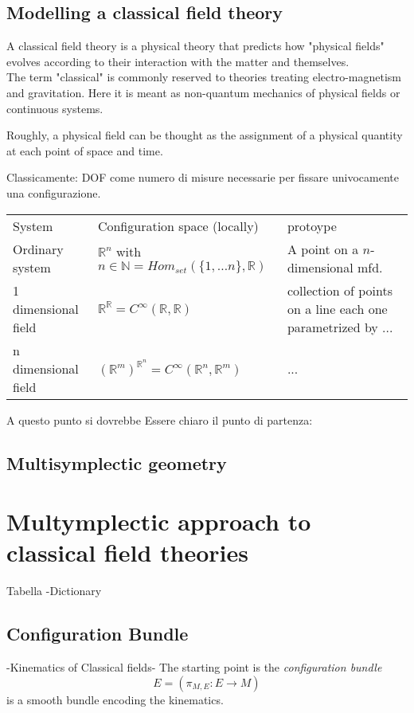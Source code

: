 \subsection{Modelling a classical field theory}
A classical field theory is a physical theory that predicts how "physical fields" evolves according to their interaction with the matter and themselves.
\\
The term "classical" is commonly reserved to theories treating electro-magnetism and gravitation. Here it is meant as non-quantum mechanics of physical fields or continuous systems.

Roughly, a physical field can be thought as the assignment of a physical quantity at each point of space and time.


Classicamente: DOF come numero di misure necessarie per fissare univocamente una configurazione.
\begin{table}[]
\begin{tabular}{lll}
	System & Configuration space (locally) & protoype 
 	\\
	Ordinary system & $\mathbb{R}^n$ with $n\in \mathbb{N} = Hom_{set}(\{1,\ldots n\}, \mathbb{R})$ & A point on a $n$-dimensional mfd.
	\\
	1 dimensional field & $\mathbb{R}^\mathbb{R} = C^\infty(\mathbb{R},\mathbb{R})$ & collection of points on a line each one parametrized by ...
	\\
	n dimensional field & $(\mathbb{R}^m)^{\mathbb{R}^n} = C^\infty (\mathbb{R}^n, \mathbb{R}^m)$ & ...
\end{tabular}
\end{table}

A questo punto si dovrebbe Essere chiaro il punto di partenza:
\\

\subsection{Multisymplectic geometry}


\section{Multymplectic approach to classical field theories}
Tabella -Dictionary


\subsection{Configuration Bundle}
-Kinematics of Classical fields-
The starting point is the \emph{configuration bundle} 
 	\begin{displaymath}
 		E = \left( \pi_{M,E} : E\rightarrow M \right)
 	\end{displaymath}
is a smooth bundle encoding the kinematics.

